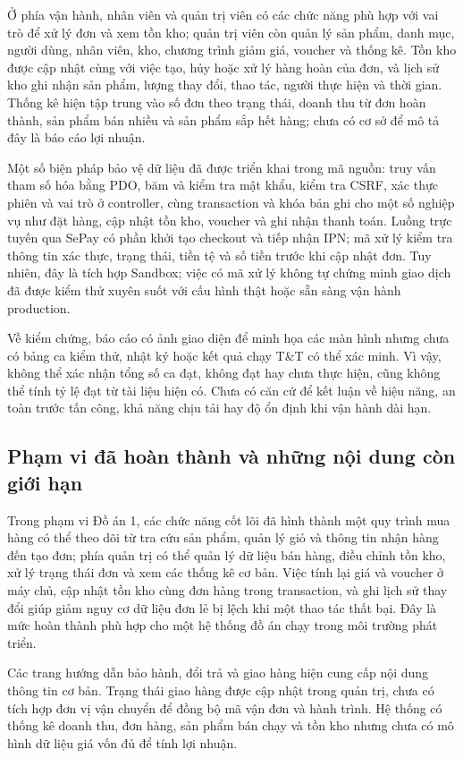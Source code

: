 Ở phía vận hành, nhân viên và quản trị viên có các chức năng phù hợp với vai trò để xử lý đơn và xem tồn kho; quản trị viên còn quản lý sản phẩm, danh mục, người dùng, nhân viên, kho, chương trình giảm giá, voucher và thống kê. Tồn kho được cập nhật cùng với việc tạo, hủy hoặc xử lý hàng hoàn của đơn, và lịch sử kho ghi nhận sản phẩm, lượng thay đổi, thao tác, người thực hiện và thời gian. Thống kê hiện tập trung vào số đơn theo trạng thái, doanh thu từ đơn hoàn thành, sản phẩm bán nhiều và sản phẩm sắp hết hàng; chưa có cơ sở để mô tả đây là báo cáo lợi nhuận.

Một số biện pháp bảo vệ dữ liệu đã được triển khai trong mã nguồn: truy vấn tham số hóa bằng PDO, băm và kiểm tra mật khẩu, kiểm tra CSRF, xác thực phiên và vai trò ở controller, cùng transaction và khóa bản ghi cho một số nghiệp vụ như đặt hàng, cập nhật tồn kho, voucher và ghi nhận thanh toán. Luồng trực tuyến qua SePay có phần khởi tạo checkout và tiếp nhận IPN; mã xử lý kiểm tra thông tin xác thực, trạng thái, tiền tệ và số tiền trước khi cập nhật đơn. Tuy nhiên, đây là tích hợp Sandbox; việc có mã xử lý không tự chứng minh giao dịch đã được kiểm thử xuyên suốt với cấu hình thật hoặc sẵn sàng vận hành production.

Về kiểm chứng, báo cáo có ảnh giao diện để minh họa các màn hình nhưng chưa có bảng ca kiểm thử, nhật ký hoặc kết quả chạy T\&T có thể xác minh. Vì vậy, không thể xác nhận tổng số ca đạt, không đạt hay chưa thực hiện, cũng không thể tính tỷ lệ đạt từ tài liệu hiện có. Chưa có căn cứ để kết luận về hiệu năng, an toàn trước tấn công, khả năng chịu tải hay độ ổn định khi vận hành dài hạn.

\subsection{Phạm vi đã hoàn thành và những nội dung còn giới hạn}

Trong phạm vi Đồ án 1, các chức năng cốt lõi đã hình thành một quy trình mua hàng có thể theo dõi từ tra cứu sản phẩm, quản lý giỏ và thông tin nhận hàng đến tạo đơn; phía quản trị có thể quản lý dữ liệu bán hàng, điều chỉnh tồn kho, xử lý trạng thái đơn và xem các thống kê cơ bản. Việc tính lại giá và voucher ở máy chủ, cập nhật tồn kho cùng đơn hàng trong transaction, và ghi lịch sử thay đổi giúp giảm nguy cơ dữ liệu đơn lẻ bị lệch khi một thao tác thất bại. Đây là mức hoàn thành phù hợp cho một hệ thống đồ án chạy trong môi trường phát triển.

Các trang hướng dẫn bảo hành, đổi trả và giao hàng hiện cung cấp nội dung thông tin cơ bản. Trạng thái giao hàng được cập nhật trong quản trị, chưa có tích hợp đơn vị vận chuyển để đồng bộ mã vận đơn và hành trình. Hệ thống có thống kê doanh thu, đơn hàng, sản phẩm bán chạy và tồn kho nhưng chưa có mô hình dữ liệu giá vốn đủ để tính lợi nhuận.

